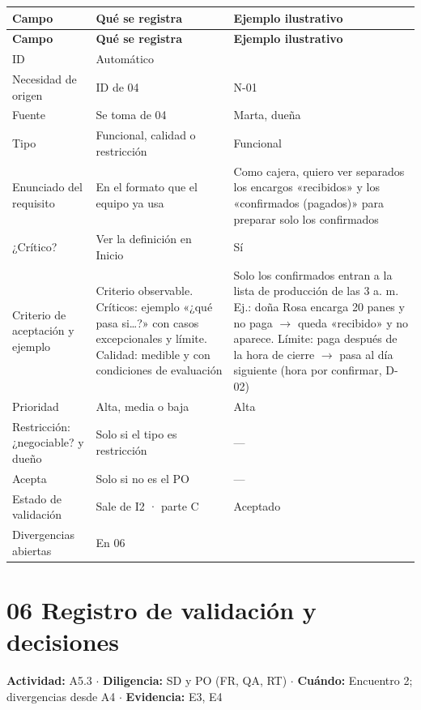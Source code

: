 \documentclass[12pt,letterpaper,oneside]{report}
\begin{document}
{\scriptsize\renewcommand{\arraystretch}{1.25}\setlength{\tabcolsep}{3pt}
\begin{xltabular}{\textwidth}{@{}>{\raggedright\arraybackslash}p{0.25\textwidth}>{\raggedright\arraybackslash}X>{\raggedright\arraybackslash}p{0.30\textwidth}@{}}
\toprule
\textbf{Campo} & \textbf{Qué se registra} & \textbf{Ejemplo ilustrativo} \\
\midrule
\endfirsthead
\toprule
\textbf{Campo} & \textbf{Qué se registra} & \textbf{Ejemplo ilustrativo} \\
\midrule
\endhead
\bottomrule
\endlastfoot
{}ID & Automático &  \\
Necesidad de origen & ID de 04 & N-01 \\
Fuente & Se toma de 04 & Marta, dueña \\
Tipo & Funcional, calidad o restricción & Funcional \\
Enunciado del requisito & En el formato que el equipo ya usa & Como cajera, quiero ver separados los encargos «recibidos» y los «confirmados (pagados)» para preparar solo los confirmados \\
¿Crítico? & Ver la definición en Inicio & Sí \\
Criterio de aceptación y ejemplo & Criterio observable. Críticos: ejemplo «¿qué pasa si\ldots{}?» con casos excepcionales y límite. Calidad: medible y con condiciones de evaluación & Solo los confirmados entran a la lista de producción de las 3 a. m. Ej.: doña Rosa encarga 20 panes y no paga $\to$ queda «recibido» y no aparece. Límite: paga después de la hora de cierre $\to$ pasa al día siguiente (hora por confirmar, D-02) \\
Prioridad & Alta, media o baja & Alta \\
Restricción: ¿negociable? y dueño & Solo si el tipo es restricción & — \\
Acepta & Solo si no es el PO & — \\
Estado de validación & Sale de I2 · parte C & Aceptado \\
Divergencias abiertas & En 06 & 0 \\
\end{xltabular}}

\section{06 Registro de validación y decisiones}
\noindent\textbf{Actividad:} A5.3 $\cdot$ \textbf{Diligencia:} SD y PO (FR, QA, RT) $\cdot$ \textbf{Cuándo:} Encuentro 2; divergencias desde A4 $\cdot$ \textbf{Evidencia:} E3, E4
\end{document}
